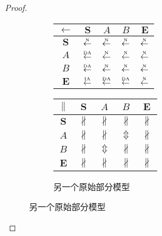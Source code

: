 \begin{proof}
\begin{figure}[htbp]
\begin{subfigure}{1\textwidth}
\begin{minipage}[b]{0.3\textwidth}
      \vspace{1em}
      \centering
      \begin{tabular}{|c|c|c|c|c|} \hline
        $\leftarrow$ & $\bm{S}$ & $A$ & $B$ & $\bm{E}$\\ \hline
        $\bm{S}$ & $\overset{\text{\tiny{N}}}{\leftarrow}$ & $\overset{\text{\tiny{N}}}{\leftarrow}$ & $\overset{\text{\tiny{N}}}{\leftarrow}$ & $\overset{\text{\tiny{N}}}{\leftarrow}$\\ \hline
        $A$ & $\overset{\text{\tiny{DA}}}{\leftarrow}$ & $\overset{\text{\tiny{N}}}{\leftarrow}$ & $\overset{\text{\tiny{N}}}{\leftarrow}$ & $\overset{\text{\tiny{N}}}{\leftarrow}$\\ \hline
        $B$ & $\overset{\text{\tiny{DA}}}{\leftarrow}$ & $\overset{\text{\tiny{N}}}{\leftarrow}$ & $\overset{\text{\tiny{N}}}{\leftarrow}$ & $\overset{\text{\tiny{N}}}{\leftarrow}$\\ \hline
        $\bm{E}$ & $\overset{\text{\tiny{IA}}}{\leftarrow}$ & $\overset{\text{\tiny{DA}}}{\leftarrow}$ & $\overset{\text{\tiny{DA}}}{\leftarrow}$ & $\overset{\text{\tiny{N}}}{\leftarrow}$\\ \hline
      \end{tabular}
    \end{minipage}
    \begin{minipage}[b]{0.3\textwidth}
      \vspace{1em}
      \centering
      \begin{tabular}{|c|c|c|c|c|} \hline
        $\parallel$ & $\bm{S}$ & $A$ & $B$ & $\bm{E}$\\ \hline
        $\bm{S}$ & $\nparallel$ & $\nparallel$ & $\nparallel$ & $\nparallel$\\ \hline
        $A$ & $\nparallel$ & $\nparallel$ & $\Updownarrow$ & $\nparallel$\\ \hline
        $B$ & $\nparallel$ & $\Updownarrow$ & $\nparallel$ & $\nparallel$\\ \hline
        $\bm{E}$ & $\nparallel$ & $\nparallel$ & $\nparallel$ & $\nparallel$\\ \hline
      \end{tabular}
    \end{minipage}
    \caption{另一个原始部分模型}
    \label{fig:uniqueness_3_e}
  \end{subfigure}


\end{figure}
\end{proof}
